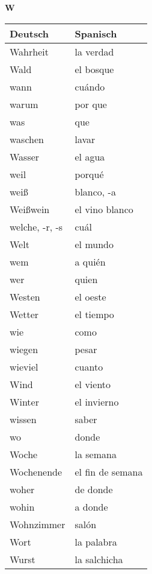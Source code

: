 \begin{flushright}\begin{Huge}\textbf{W}\end{Huge}\end{flushright}

\begin{longtable}{p{} p{}} 
\textbf{Deutsch}     & \textbf{Spanisch}                                       \\ \hline
\hline
\endhead %
Wahrheit & la verdad\\
Wald & el bosque\\
wann & cuándo\\
warum & por que\\
was & que\\
waschen & lavar\\
Wasser & el agua\\
weil & porqué\\
weiß & blanco, -a\\
Weißwein & el vino blanco\\
welche, -r, -s & cuál \\
Welt & el mundo\\
wem & a quién\\
wer & quien\\
Westen & el oeste\\
Wetter & el tiempo\\
wie & como\\
wiegen & pesar\\
wieviel & cuanto \\
Wind & el viento\\
Winter & el invierno\\
wissen & saber\\
wo & donde\\
Woche & la semana\\
Wochenende & el fin de semana\\
woher & de donde\\
wohin & a donde\\
Wohnzimmer & salón\\
Wort & la palabra\\
Wurst & la salchicha\\
\end{longtable}
